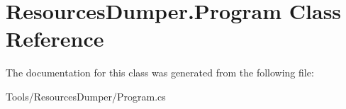\hypertarget{class_resources_dumper_1_1_program}{\section{Resources\-Dumper.\-Program Class Reference}
\label{class_resources_dumper_1_1_program}
}


The documentation for this class was generated from the following file\-:\begin{DoxyCompactItemize}
\item 
Tools/\-Resources\-Dumper/Program.\-cs\end{DoxyCompactItemize}
